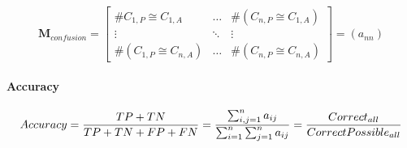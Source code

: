 \documentclass[10pt]{article}
\newif\ifen
\newif\ifde
\newcommand{\en}[1]{\ifen#1\fi}
\newcommand{\de}[1]{\ifde#1\fi}
\begin{document}
			 	\de{Zum Schluß besitzt die Confusion Matrix folgenden Aufbau, wobei die Anzahl von Elementen in der Klasse \(C_{i,P}\) vorhergesagt wurde, obwohl (\(\boldsymbol{\cong}\)) es hätte Klasse \(C_{j,A}\) sein müssen:}
				\en{Finally, the Confusion Matrix has the following structure, where the number of elements in the class \(C_{i,P}\) was predicted although (\(\boldsymbol{\cong}\)) it should have been class \(C_{j,A}\):}

				\begin{equation}
					\boldsymbol{M}_{confusion} = \begin{bmatrix}
						\#C_{1,P}\boldsymbol{\cong} C_{1,A} & \dots & \#(C_{n,P}\boldsymbol{\cong} C_{1,A}) \\
						\vdots & \ddots & \vdots \\
						\#(C_{1,P}\boldsymbol{\cong} C_{n,A}) & \dots & \#(C_{n,P}\boldsymbol{\cong} C_{n,A})
					\end{bmatrix} = (a_{nn})
				\end{equation}

			\paragraph{Accuracy}
				\de{Die \textbf{Top-1-Genauigkeit} ist wahrscheinlich die wichtigste Genauigkeit. Sie sagt sagt aus, zu wieviel Prozent die jeweils beste Aussage des Modells auf die Daten des Validierungssets mit der erwarteten Klasse übereinstimmt.}
				\en{\textbf{Top-1 accuracy} is probably the most important accuracy. It tells you the percentage of the model's best prediction of the data in the validation set that matches the expected class.}

				\begin{equation}
					Accuracy = {{TP + TN} \over {TP + TN + FP + FN}} = {{\sum_{i,j=1}^{n} a_{ij}} \over {\sum_{i=1}^{n} \sum_{j=1}^{n} a_{ij}}} = {{Correct_{all}} \over {CorrectPossible_{all}}}
				\end{equation}

				\de{Die \textbf{Top-5-Genauigkeit} ist eine weitere Genauigkeitsangabe. Jedoch wird hier nicht nur der beste Treffer einbezogen, sondern auch die nächsten weiteren vier. Sobald die richtige Klasse innerhalb der ersten fünf vorhergesagten Klassen gefunden werden kann, so ist auch diese Vorhersage wahr:}
				\en{The \textbf{Top 5 Accuracy} is another accuracy specification. However, not only the best hit is included here, but also the next four. As soon as the correct class can be found within the first five predicted classes, this prediction is also true:}
				
\end{document}

